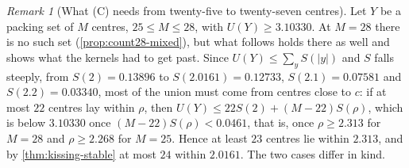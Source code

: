 \documentclass[11pt,reqno]{amsart}
\renewcommand{\_}{\origunderscore\allowbreak}
\numberwithin{equation}{section}
\theoremstyle{plain}
\theoremstyle{definition}
\theoremstyle{remark}
\newtheorem{remark}[thm]{Remark}
\begin{document}
\begin{remark}[What (C) needs from twenty-five to twenty-seven centres]\label{rem:what-c-needs}
Let $Y$ be a packing set of $M$ centres, $25\le M\le28$, with
$U(Y)\ge3.10330$. At $M=28$ there is no such set
(\cref{prop:count28-mixed}), but what follows holds there as well and
shows what the kernels had to get past. Since $U(Y)\le\sum_yS(|y|)$ and $S$ falls steeply,
from $S(2)=0.13896$ to $S(2.0161)=0.12733$, $S(2.1)=0.07581$ and
$S(2.2)=0.03340$, most of the union must come from centres close to $c$: if
at most $22$ centres lay within $\rho$, then
$U(Y)\le22S(2)+(M-22)S(\rho)$, which is below $3.10330$ once
$(M-22)S(\rho)<0.0461$, that is, once $\rho\ge2.313$ for $M=28$ and
$\rho\ge2.268$ for $M=25$. Hence at least $23$ centres lie within
$2.313$, and by \cref{thm:kissing-stable} at most $24$ within $2.0161$. The
two cases differ in kind.


\end{remark}
\end{document}
